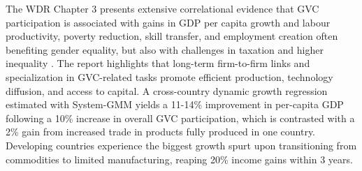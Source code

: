\documentclass[a4paper]{article}
\begin{document}
The WDR Chapter 3 presents extensive correlational evidence that GVC participation is associated with gains in GDP per capita growth and labour productivity, poverty reduction, skill transfer, and employment creation often benefiting gender equality, but also with challenges in taxation and higher inequality \citep{world2020trading, antras2022global}. The report highlights that long-term firm-to-firm links and specialization in GVC-related tasks promote efficient production, technology diffusion, and access to capital. A cross-country dynamic growth regression estimated with System-GMM yields a 11-14\% improvement in per-capita GDP following a 10\% increase in overall GVC participation, which is contrasted with a 2\% gain from increased trade in products fully produced in one country. Developing countries experience the biggest growth spurt upon transitioning from commodities to limited manufacturing, reaping 20\% income gains within 3 years. \newline
\end{document}
